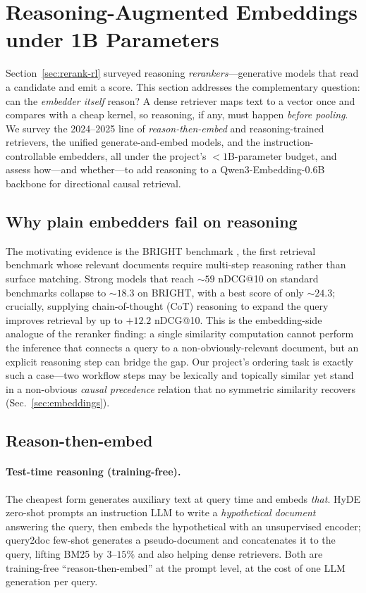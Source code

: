 \section{Reasoning-Augmented Embeddings under 1B Parameters}
\label{sec:reasoning-embeddings}

Section~\ref{sec:rerank-rl} surveyed reasoning \emph{rerankers}---generative models
that read a candidate and emit a score. This section addresses the complementary
question: can the \emph{embedder itself} reason? A dense retriever maps text to a
vector once and compares with a cheap kernel, so reasoning, if any, must happen
\emph{before pooling}. We survey the 2024--2025 line of \emph{reason-then-embed} and
reasoning-trained retrievers, the unified generate-and-embed models, and the
instruction-controllable embedders, all under the project's $<\!1$B-parameter budget,
and assess how---and whether---to add reasoning to a Qwen3-Embedding-0.6B backbone for
directional causal retrieval.

\subsection{Why plain embedders fail on reasoning}
\label{sec:re:bright}
The motivating evidence is the BRIGHT benchmark \citep{re:su2024bright}, the first
retrieval benchmark whose relevant documents require multi-step reasoning rather than
surface matching. Strong models that reach ${\sim}59$ nDCG@10 on standard benchmarks
collapse to ${\sim}18.3$ on BRIGHT, with a best score of only ${\sim}24.3$; crucially,
supplying chain-of-thought (CoT) reasoning to expand the query improves retrieval by up
to $+12.2$ nDCG@10. This is the embedding-side analogue of the reranker finding: a
single similarity computation cannot perform the inference that connects a query to a
non-obviously-relevant document, but an explicit reasoning step can bridge the gap. Our
project's ordering task is exactly such a case---two workflow steps may be lexically
and topically similar yet stand in a non-obvious \emph{causal precedence} relation that
no symmetric similarity recovers (Sec.~\ref{sec:embeddings}).

\subsection{Reason-then-embed}
\label{sec:re:rte}
\paragraph{Test-time reasoning (training-free).} The cheapest form generates auxiliary
text at query time and embeds \emph{that}. HyDE \citep{re:gao2023hyde} zero-shot
prompts an instruction LLM to write a \emph{hypothetical document} answering the query,
then embeds the hypothetical with an unsupervised encoder; query2doc
\citep{re:wang2023query2doc} few-shot generates a pseudo-document and concatenates it to
the query, lifting BM25 by $3$--$15\%$ and also helping dense retrievers. Both are
training-free ``reason-then-embed'' at the prompt level, at the cost of one LLM
generation per query.


